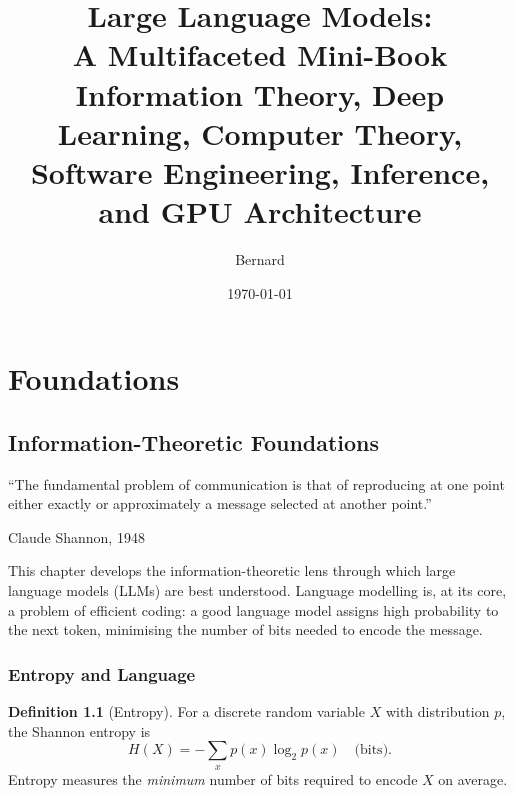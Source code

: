 \documentclass[11pt,a4paper]{book}
\theoremstyle{definition}
\newtheorem{definition}{Definition}[chapter]
\begin{document}
\title{\Huge\textbf{Large Language Models: \\ A Multifaceted Mini-Book}\\[1cm]
	\large Information Theory, Deep Learning, Computer Theory,\\
	Software Engineering, Inference, and GPU Architecture}
\author{Bernard}
\date{\today}
\maketitle
\thispagestyle{empty}
\newpage

\tableofcontents
\newpage

\part{Foundations}

\chapter{Information-Theoretic Foundations}
\label{ch:info-theory}

\epigraph{``The fundamental problem of communication is that of reproducing at one point either exactly or approximately a message selected at another point.''}{Claude Shannon, 1948}

This chapter develops the information-theoretic lens through which large language models (LLMs) are best understood. Language modelling is, at its core, a problem of efficient coding: a good language model assigns high probability to the next token, minimising the number of bits needed to encode the message.

\section{Entropy and Language}

\begin{definition}[Entropy]
	For a discrete random variable $X$ with distribution $p$, the Shannon entropy is
	\begin{equation}
		H(X) = -\sum_{x} p(x) \log_2 p(x) \quad\text{(bits)}.
	\end{equation}
	Entropy measures the \emph{minimum} number of bits required to encode $X$ on average.
\end{definition}
\end{document}

